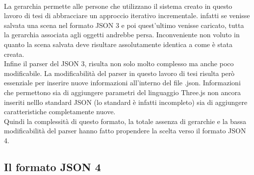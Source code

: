 \\
La gerarchia permette alle persone che utilizzano il sistema creato in questo lavoro di tesi di abbracciare un approccio iterativo incrementale. infatti se venisse salvata una scena nel formato JSON 3 e poi quest’ultimo venisse caricato, tutta la gerarchia associata agli oggetti andrebbe persa. Inconveniente non voluto in quanto la scena salvata deve risultare assolutamente identica a come è stata creata.
\\
Infine il parser del JSON 3, risulta non solo molto complesso ma anche poco modificabile. La modificabilità del parser in questo lavoro di tesi risulta però essenziale per inserire nuove informazioni all’interno del file .json. Informazioni che permettono sia di aggiungere parametri del linguaggio Three.js non ancora inseriti nelllo standard JSON (lo standard è infatti incompleto) sia di aggiungere caratteristiche completamente nuove.
\\
Quindi la complessità di questo formato, la totale assenza di gerarchie e la bassa modificabilità del parser hanno fatto propendere la scelta verso il formato JSON 4.

\subsection{Il formato JSON 4}
\label{sec:formato_scambio_formato_json4}

